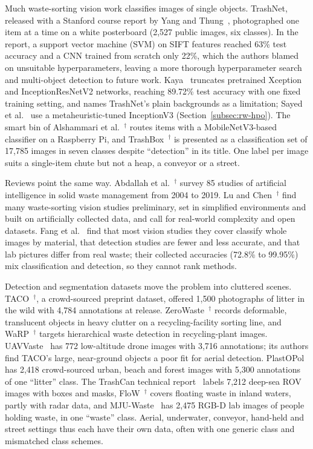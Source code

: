 Much waste-sorting vision work classifies images of single objects. TrashNet, released with a Stanford course report by Yang and Thung~\cite{yang2016classification}, photographed one item at a time on a white posterboard (2,527 public images, six classes). In the report, a support vector machine (SVM) on SIFT features reached 63\% test accuracy and a CNN trained from scratch only 22\%, which the authors blamed on unsuitable hyperparameters, leaving a more thorough hyperparameter search and multi-object detection to future work. Kaya~\cite{kaya2023classification} truncates pretrained Xception and InceptionResNetV2 networks, reaching 89.72\% test accuracy with one fixed training setting, and names TrashNet's plain backgrounds as a limitation; Sayed et al.~\cite{sayed2024intelligent} use a metaheuristic-tuned InceptionV3 (Section~\ref{subsec:rw-hpo}). The smart bin of Alshammari et al.~\cite{alshammari2025smart}$^{\dagger}$ routes items with a MobileNetV3-based classifier on a Raspberry Pi, and TrashBox~\cite{kumsetty2022trashbox}$^{\dagger}$ is presented as a classification set of 17,785 images in seven classes despite ``detection'' in its title. One label per image suits a single-item chute but not a heap, a conveyor or a street.

Reviews point the same way. Abdallah et al.~\cite{abdallah2020artificial}$^{\dagger}$ survey 85 studies of artificial intelligence in solid waste management from 2004 to 2019. Lu and Chen~\cite{lu2022computer}$^{\dagger}$ find many waste-sorting vision studies preliminary, set in simplified environments and built on artificially collected data, and call for real-world complexity and open datasets. Fang et al.~\cite{fang2023artificial} find that most vision studies they cover classify whole images by material, that detection studies are fewer and less accurate, and that lab pictures differ from real waste; their collected accuracies (72.8\% to 99.95\%) mix classification and detection, so they cannot rank methods.

Detection and segmentation datasets move the problem into cluttered scenes. TACO~\cite{proenca2020taco}$^{\dagger}$, a crowd-sourced preprint dataset, offered 1,500 photographs of litter in the wild with 4,784 annotations at release. ZeroWaste~\cite{bashkirova2022zerowaste}$^{\dagger}$ records deformable, translucent objects in heavy clutter on a recycling-facility sorting line, and WaRP~\cite{yudin2024hierarchical}$^{\dagger}$ targets hierarchical waste detection in recycling-plant images. UAVVaste~\cite{kraft2021autonomous} has 772 low-altitude drone images with 3,716 annotations; its authors find TACO's large, near-ground objects a poor fit for aerial detection. PlastOPol~\cite{cordova2022litter} has 2,418 crowd-sourced urban, beach and forest images with 5,300 annotations of one ``litter'' class. The TrashCan technical report~\cite{hong2020trashcan} labels 7,212 deep-sea ROV images with boxes and masks, FloW~\cite{cheng2021flow}$^{\dagger}$ covers floating waste in inland waters, partly with radar data, and MJU-Waste~\cite{wang2020multilevel} has 2,475 RGB-D lab images of people holding waste, in one ``waste'' class. Aerial, underwater, conveyor, hand-held and street settings thus each have their own data, often with one generic class and mismatched class schemes.


